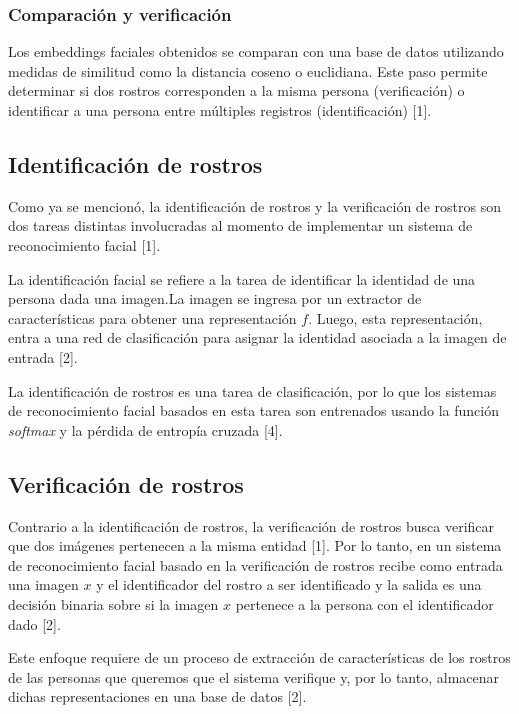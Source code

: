 \subsubsection{Comparación y verificación}

Los embeddings faciales obtenidos se comparan con una base de datos utilizando medidas de similitud como la distancia coseno o euclidiana. Este paso permite determinar si dos rostros corresponden a la misma persona (verificación) o identificar a una persona entre múltiples registros (identificación) [1].


\subsection{Identificación de rostros}

Como ya se mencionó, la identificación de rostros y la verificación de rostros son dos tareas distintas involucradas al momento de implementar un sistema de reconocimiento facial [1].

La identificación facial se refiere a la tarea de identificar la identidad de una persona dada una imagen.La imagen se ingresa por un extractor de características para obtener una representación $f$. Luego, esta representación, entra a una red de clasificación para asignar la identidad asociada a la imagen de entrada [2].

La identificación de rostros es una tarea de clasificación, por lo que los sistemas de reconocimiento facial basados en esta tarea son entrenados usando la función \textit{softmax} y la pérdida de entropía cruzada [4].

\subsection{Verificación de rostros}

Contrario a la identificación de rostros, la verificación de rostros busca verificar que dos imágenes pertenecen a la misma entidad [1]. Por lo tanto, en un sistema de reconocimiento facial basado en la verificación de rostros recibe como entrada una imagen $x$ y el identificador del rostro a ser identificado y la salida es una decisión binaria sobre si la imagen $x$ pertenece a la persona con el identificador dado [2].

Este enfoque requiere de un proceso de extracción de características de los rostros de las personas que queremos que el sistema verifique y, por lo tanto, almacenar dichas representaciones en una base de datos [2].

